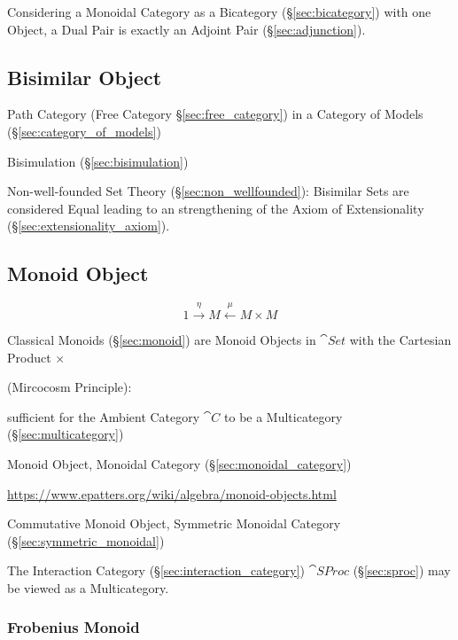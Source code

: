 Considering a Monoidal Category as a Bicategory
(\S\ref{sec:bicategory}) with one Object, a Dual Pair is exactly an
Adjoint Pair (\S\ref{sec:adjunction}).



\subsection{Bisimilar Object}\label{sec:bisimilar_object}

Path Category (Free Category \S\ref{sec:free_category}) in a Category
of Models (\S\ref{sec:category_of_models})

Bisimulation (\S\ref{sec:bisimulation})

Non-well-founded Set Theory (\S\ref{sec:non_wellfounded}): Bisimilar
Sets are considered Equal leading to an strengthening of the Axiom of
Extensionality (\S\ref{sec:extensionality_axiom}).



\subsection{Monoid Object}\label{sec:monoid_object}

\[
  1 \xrightarrow{\eta} M \xleftarrow{\mu} M \times M
\]

Classical Monoids (\S\ref{sec:monoid}) are Monoid Objects in
$\cat{Set}$ with the Cartesian Product $\times$

(Mircocosm Principle): %

sufficient for the Ambient Category $\cat{C}$ to be a Multicategory
(\S\ref{sec:multicategory})

Monoid Object, Monoidal Category (\S\ref{sec:monoidal_category})

\url{https://www.epatters.org/wiki/algebra/monoid-objects.html}

Commutative Monoid Object, Symmetric Monoidal Category
(\S\ref{sec:symmetric_monoidal})

The Interaction Category (\S\ref{sec:interaction_category})
$\cat{SProc}$ (\S\ref{sec:sproc}) may be viewed as a Multicategory.



\subsubsection{Frobenius Monoid}\label{sec:frobenius_monoid}

